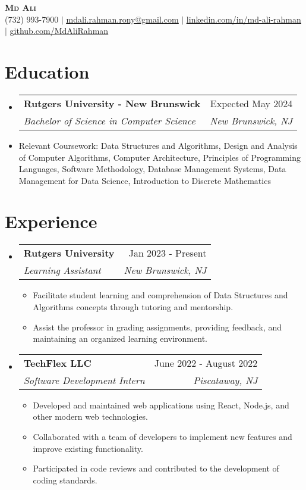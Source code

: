 \documentclass[letterpaper,11pt]{article}
\makeatletter
\newcommand{\resumeItem}[1]{
\item\small{
{#1 \vspace{-2pt}}
}
}
\newcommand{\resumeSubheading}[4]{
\vspace{-2pt}\item
\begin{tabular*}{0.97\textwidth}[t]{l@{\extracolsep{\fill}}r}
\textbf{#1} & #2 \\
\textit{\small#3} & \textit{\small #4} \\
\end{tabular*}\vspace{-7pt}
}
\newcommand{\resumeSubItem}[1]{\resumeItem{#1}\vspace{-4pt}}
\newcommand{\resumeSubHeadingListStart}{\begin{itemize}[leftmargin=0.15in, label={}]}
\newcommand{\resumeSubHeadingListEnd}{\end{itemize}}
\newcommand{\resumeItemListStart}{\begin{itemize}}
\newcommand{\resumeItemListEnd}{\end{itemize}\vspace{-5pt}}
\makeatother
\begin{document}
\begin{center}
\textbf{\Huge \scshape Md Ali} \\ \vspace{1pt}
\small (732) 993-7900 $|$ \href{mailto:mdali.rahman.rony@gmail.com}{\underline{mdali.rahman.rony@gmail.com}} $|$
\href{https://www.linkedin.com/in/md-ali-rahman/}{\underline{linkedin.com/in/md-ali-rahman}} $|$
\href{https://github.com/MdAliRahman}{\underline{github.com/MdAliRahman}}
\end{center}


\section{Education}
\resumeSubHeadingListStart
\resumeSubheading{Rutgers University - New Brunswick}{Expected May 2024}{Bachelor of Science in Computer Science}{New Brunswick, NJ}
\resumeSubItem{Relevant Coursework: Data Structures and Algorithms, Design and Analysis of Computer Algorithms, Computer Architecture, Principles of Programming Languages, Software Methodology, Database Management Systems, Data Management for Data Science, Introduction to Discrete Mathematics}
\resumeSubHeadingListEnd

\section{Experience}
\resumeSubHeadingListStart
\resumeSubheading{Rutgers University}{Jan 2023 - Present}{Learning Assistant}{New Brunswick, NJ}
\resumeItemListStart
\resumeItem{Facilitate student learning and comprehension of Data Structures and Algorithms concepts through tutoring and mentorship.}
\resumeItem{Assist the professor in grading assignments, providing feedback, and maintaining an organized learning environment.}
\resumeItemListEnd

\resumeSubheading{TechFlex LLC}{June 2022 - August 2022}{Software Development Intern}{Piscataway, NJ}
\resumeItemListStart
\resumeItem{Developed and maintained web applications using React, Node.js, and other modern web technologies.}
\resumeItem{Collaborated with a team of developers to implement new features and improve existing functionality.}
\resumeItem{Participated in code reviews and contributed to the development of coding standards.}
\resumeItemListEnd

\resumeSubHeadingListEnd
\end{document}
